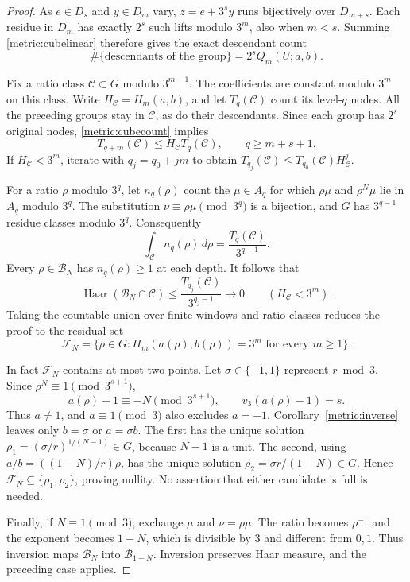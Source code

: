\begin{proof}
As $e\in D_s$ and $y\in D_m$ vary, $z=e+3^s y$ runs bijectively
over $D_{m+s}$. Each residue in $D_m$ has exactly $2^s$ such lifts
modulo $3^m$, also when $m<s$. Summing \eqref{metric:cubelinear}
therefore gives the exact descendant count
\begin{equation}\label{metric:cubecount}
                \#\{\text{descendants of the group}\}
                         =2^s Q_m(U;a,b).
\end{equation}

Fix a ratio class $\mathcal C\subset G$ modulo $3^{m+1}$.
The coefficients are constant modulo $3^m$ on this class. Write
$H_{\mathcal C}=H_m(a,b)$, and let $T_q(\mathcal C)$ count its
level-$q$ nodes. All the preceding groups stay in $\mathcal C$,
as do their descendants. Since each group has $2^s$ original nodes,
\eqref{metric:cubecount} implies
\begin{equation}\label{metric:contraction}
             T_{q+m}(\mathcal C)\leq H_{\mathcal C}T_q(\mathcal C),
             \qquad q\geq m+s+1.
\end{equation}
If $H_{\mathcal C}<3^m$, iterate with $q_j=q_0+jm$ to obtain
$T_{q_j}(\mathcal C)\leq T_{q_0}(\mathcal C)H_{\mathcal C}^j$.

For a ratio $\rho$ modulo $3^q$, let $n_q(\rho)$ count the
$\mu\in A_q$ for which $\rho\mu$ and $\rho^N\mu$ lie in $A_q$
modulo $3^q$. The substitution $\nu\equiv\rho\mu\pmod{3^q}$
is a bijection, and $G$ has $3^{q-1}$ residue classes modulo $3^q$.
Consequently
\[
 \int_{\mathcal C}n_q(\rho)\,d\rho
                     =\frac{T_q(\mathcal C)}{3^{q-1}}.
\]
Every $\rho\in\mathcal B_N$ has $n_q(\rho)\geq1$ at each depth.
It follows that
\[
 \operatorname{Haar}(\mathcal B_N\cap\mathcal C)
 \leq\frac{T_{q_j}(\mathcal C)}{3^{q_j-1}}\longrightarrow0
 \qquad(H_{\mathcal C}<3^m).
\]
Taking the countable union over finite windows and ratio classes
reduces the proof to the residual set
\[
 \mathcal F_N=\{\rho\in G:H_m(a(\rho),b(\rho))=3^m
                                      \text{ for every }m\geq1\}.
\]

In fact $\mathcal F_N$ contains at most two points. Let
$\sigma\in\{-1,1\}$ represent $r\bmod3$. Since
$\rho^N\equiv1\pmod{3^{s+1}}$,
\[
                    a(\rho)-1\equiv-N\pmod{3^{s+1}},
                    \qquad v_3(a(\rho)-1)=s.
\]
Thus $a\ne1$, and $a\equiv1\pmod3$ also excludes $a=-1$.
Corollary~\ref{metric:inverse} leaves only $b=\sigma$ or
$a=\sigma b$. The first has the unique solution
$\rho_1=(\sigma/r)^{1/(N-1)}\in G$, because $N-1$ is a unit.
The second, using $a/b=((1-N)/r)\rho$, has the unique solution
$\rho_2=\sigma r/(1-N)\in G$. Hence
$\mathcal F_N\subseteq\{\rho_1,\rho_2\}$, proving nullity.
No assertion that either candidate is full is needed.

Finally, if $N\equiv1\pmod3$, exchange $\mu$ and $\nu=\rho\mu$.
The ratio becomes $\rho^{-1}$ and the exponent becomes $1-N$,
which is divisible by $3$ and different from $0,1$.
Thus inversion maps $\mathcal B_N$ into $\mathcal B_{1-N}$.
Inversion preserves Haar measure, and the preceding case applies.
\end{proof}

